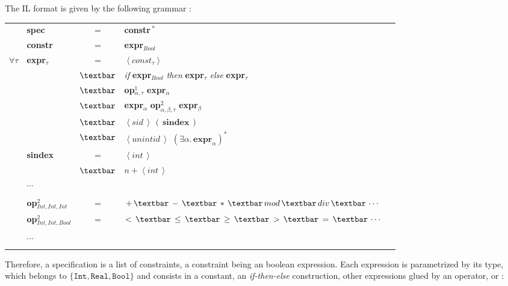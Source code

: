 The IL format is given by the  following grammar :

\bigskip

\begin{tabular}{llclr}
& \textbf{spec} & = & \textbf{constr}$\,^*$ & \\
& \textbf{constr} & = & \textbf{expr}$_{Bool}$ & \\
$\forall \tau$ & \textbf{expr}$_{\tau}$ & = & $\left< \textit{const}_\tau  \right>$ &\\
& & $\textbar$ & \textit{if} \textbf{expr}$_{Bool}$ \textit{then} \textbf{expr}$_{\tau}$ \textit{else} \textbf{expr}$_{\tau}$ \\

& & $\textbar$ &\textbf{op}$^1_{\alpha, \tau}$ \textbf{expr}$_{\alpha}$ \\
& & $\textbar$ & \textbf{expr}$_{\alpha}$ \textbf{op}$^2_{\alpha, \beta, \tau}$ \textbf{expr}$_{\beta}$ \\
& & $\textbar$ & $\left< \textit{sid} \,  \right> \, \left(\,\textbf{sindex}\,\right)$ \\
& & $\textbar$ & $\left< \textit{unintid} \,  \right> $ $\left(  \exists \alpha . \, \textbf{expr}_\alpha \right)^{*}$
\\
& \textbf{sindex} & = & $\left< \textit{int} \,  \right> $ & \\
& & $\textbar$ & $ \textit{n} +  \left< \textit{int} \,  \right> $ & \\


& $\cdots$ & & \\
&&& \\

& \textbf{op}$^2_{Int, Int, Int}$ & = & $+ \,\textbar \, - \,\textbar\, *  \,\textbar\, mod  \,\textbar\, div  \,\textbar\, \cdots $ & \\
& \textbf{op}$^2_{Int, Int, Bool}$ & = & $< \,\textbar \, \leq \,\textbar\, \geq \,\textbar\, >  \,\textbar\, =  \,\textbar\, \cdots $ & \\
&&& \\
& $\cdots$ & & \\
&&& \\
\end{tabular}

\medskip

Therefore, a specification is a list of constraints, a constraint being an boolean expression. Each expression is parametrized by its type, which belongs to $\{ \texttt{Int}, \texttt{Real},  \texttt{Bool}\}$ and consists in a constant, an \textit{if-then-else} construction, other expressions glued by an operator, or :

